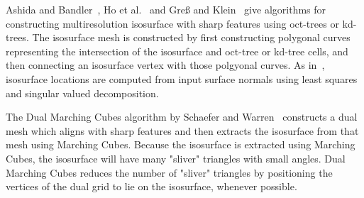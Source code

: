 Ashida and Bandler~\cite{ab-fpmmo-03}, Ho et al.~\cite{hwco-cmsaf-05}
and Gre{\ss} and Klein~\cite{gk-eretm-04} give algorithms
for constructing multiresolution isosurface with sharp features
using oct-trees or kd-trees.
The isosurface mesh is constructed
by first constructing polygonal curves representing the intersection
of the isosurface and oct-tree or kd-tree cells,
and then connecting an isosurface vertex with those polgyonal curves.
As in~\cite{jlsw-dchd-02},
isosurface locations are computed from input surface normals
using least squares and singular valued decomposition.

The Dual Marching Cubes algorithm by Schaefer and Warren~\cite{sw-dmcpc-04}
constructs a dual mesh which aligns with sharp features
and then extracts the isosurface from that mesh using Marching Cubes.
Because the isosurface is extracted using Marching Cubes,
the isosurface will have many "sliver" triangles with small angles.
Dual Marching Cubes reduces the number of "sliver" triangles
by positioning the vertices of the dual grid to lie on the isosurface,
whenever possible.

